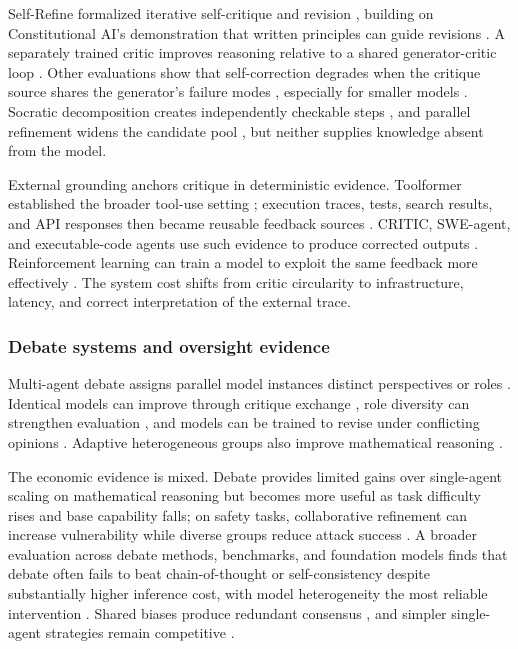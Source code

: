 Self-Refine formalized iterative self-critique and revision \citep{madaan2023selfrefine}, building on Constitutional AI's demonstration that written principles can guide revisions \citep{bai2022constitutional}. A separately trained critic improves reasoning relative to a shared generator-critic loop \citep{paul2024refiner}. Other evaluations show that self-correction degrades when the critique source shares the generator's failure modes \citep{huang2023large,kamoi2024can}, especially for smaller models \citep{olausson2024self}. Socratic decomposition creates independently checkable steps \citep{shi2025ssr}, and parallel refinement widens the candidate pool \citep{wang2025learning}, but neither supplies knowledge absent from the model.

External grounding anchors critique in deterministic evidence. Toolformer established the broader tool-use setting \citep{schick2023toolformer}; execution traces, tests, search results, and API responses then became reusable feedback sources \citep{chen2024teaching,gou2024toratoolintegratedreasoningagent}. CRITIC, SWE-agent, and executable-code agents use such evidence to produce corrected outputs \citep{gou2024critic,yang2024swe,wang2024executable}. Reinforcement learning can train a model to exploit the same feedback more effectively \citep{gehring2024rlef}. The system cost shifts from critic circularity to infrastructure, latency, and correct interpretation of the external trace.

\subsubsection{Debate systems and oversight evidence}
\label{supp:subsec:deliberative-debate}

Multi-agent debate assigns parallel model instances distinct perspectives or roles \citep{hong2024metagpt}. Identical models can improve through critique exchange \citep{du2023debate}, role diversity can strengthen evaluation \citep{chan2023chatevalbetterllmbasedevaluators}, and models can be trained to revise under conflicting opinions \citep{liu2026learningselfdebatepreparingreasoning}. Adaptive heterogeneous groups also improve mathematical reasoning \citep{zhou2025adaptive}.

The economic evidence is mixed. Debate provides limited gains over single-agent scaling on mathematical reasoning but becomes more useful as task difficulty rises and base capability falls; on safety tasks, collaborative refinement can increase vulnerability while diverse groups reduce attack success \citep{yang2025revisiting}. A broader evaluation across debate methods, benchmarks, and foundation models finds that debate often fails to beat chain-of-thought or self-consistency despite substantially higher inference cost, with model heterogeneity the most reliable intervention \citep{zhang2025stop}. Shared biases produce redundant consensus \citep{estornell2024multi,liang2024encouragingdivergentthinkinglarge}, and simpler single-agent strategies remain competitive \citep{choi2026debate}.

